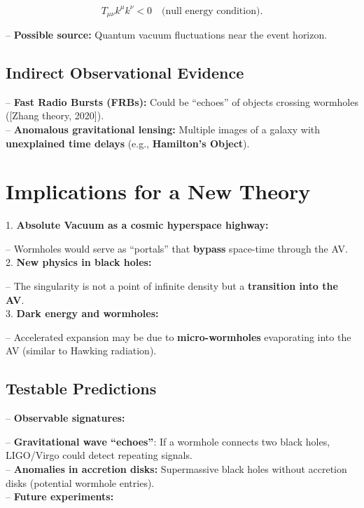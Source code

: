 \documentclass[a4paper]{article}
\theoremstyle{definition}
\theoremstyle{remark}
\numberwithin{equation}{section}
\begin{document}
\[
T_{\mu\nu} k^\mu k^\nu < 0 \quad \text{(null energy condition)}.
\]

– \textbf{Possible source:} Quantum vacuum fluctuations near the event horizon.

\subsection{Indirect Observational Evidence}

– \textbf{Fast Radio Bursts (FRBs):} Could be ``echoes'' of objects crossing wormholes ([Zhang theory, 2020]).\\

– \textbf{Anomalous gravitational lensing:} Multiple images of a galaxy with \textbf{unexplained time delays} (e.g., \textbf{Hamilton’s Object}).

\section{Implications for a New Theory}

1. \textbf{Absolute Vacuum as a cosmic hyperspace highway:}

– Wormholes would serve as ``portals'' that \textbf{bypass} space-time through the AV.\\

2. \textbf{New physics in black holes:}

– The singularity is not a point of infinite density but a \textbf{transition into the AV}.\\

3. \textbf{Dark energy and wormholes:}

– Accelerated expansion may be due to \textbf{micro-wormholes} evaporating into the AV (similar to Hawking radiation).

\subsection{Testable Predictions}

– \textbf{Observable signatures:}

– \textbf{Gravitational wave ``echoes''}: If a wormhole connects two black holes, LIGO/Virgo could detect repeating signals.\\

– \textbf{Anomalies in accretion disks:} Supermassive black holes without accretion disks (potential wormhole entries).\\

– \textbf{Future experiments:}
\end{document}
